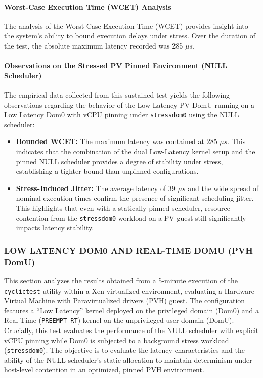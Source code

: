 \paragraph{Worst-Case Execution Time (WCET)
Analysis}\label{worst-case-execution-time-wcet-analysis-31}

The analysis of the Worst-Case Execution Time (WCET) provides insight
into the system's ability to bound execution delays under stress. Over
the duration of the test, the absolute maximum latency recorded was 285
$\mu s$.

\paragraph{Observations on the Stressed PV Pinned Environment (NULL
Scheduler)}\label{observations-on-the-stressed-pv-pinned-environment-null-scheduler}

The empirical data collected from this sustained test yields the
following observations regarding the behavior of the Low Latency PV DomU
running on a Low Latency Dom0 with vCPU pinning under
\texttt{stressdom0} using the NULL scheduler:

\begin{itemize}
\item
  \textbf{Bounded WCET:} The maximum latency was contained at 285 $\mu s$.
  This indicates that the combination of the dual Low-Latency kernel
  setup and the pinned NULL scheduler provides a degree of stability
  under stress, establishing a tighter bound than unpinned
  configurations.
\item
  \textbf{Stress-Induced Jitter:} The average latency of 39 $\mu s$ and the
  wide spread of nominal execution times confirm the presence of
  significant scheduling jitter. This highlights that even with a
  statically pinned scheduler, resource contention from the
  \texttt{stressdom0} workload on a PV guest still significantly impacts
  latency stability.
\end{itemize}

\subsubsection{LOW LATENCY DOM0 AND REAL-TIME DOMU (PVH
DomU)}\label{low-latency-dom0-and-real-time-domu-pvh-domu-3}

This section analyzes the results obtained from a 5-minute execution of
the \texttt{cyclictest} utility within a Xen virtualized environment,
evaluating a Hardware Virtual Machine with Paravirtualized drivers (PVH)
guest. The configuration features a ``Low Latency'' kernel deployed on
the privileged domain (Dom0) and a Real-Time (\texttt{PREEMPT\_RT})
kernel on the unprivileged user domain (DomU). Crucially, this test
evaluates the performance of the NULL scheduler with explicit vCPU
pinning while Dom0 is subjected to a background stress workload
(\texttt{stressdom0}). The objective is to evaluate the latency
characteristics and the ability of the NULL scheduler's static
allocation to maintain determinism under host-level contention in an
optimized, pinned PVH environment.

